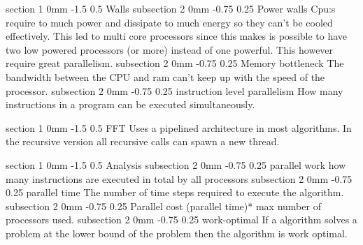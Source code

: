 \documentclass[a4paper,11pt]{article}
\makeatletter
\renewcommand{\section}{\@startsection
   {section}%
   {1}%
   {0mm}%
   {-1.5\baselineskip}%
   {0.5\baselineskip}%
   {\sffamily\bfseries\upshape\normalsize}}%
\renewcommand{\subsection}{\@startsection
   {subsection}%
   {2}%
   {0mm}%
   {-0.75\baselineskip}%
   {0.25\baselineskip}%
   {\rmfamily\normalfont\slshape\normalsize}}%
\makeatother
\begin{document}
\section{Walls}
\subsection{Power walls}
Cpu:s require to much power and dissipate to much energy so they can't be cooled effectively. This led to multi core processors since this makes is possible to have two low powered processors (or more) instead of one powerful. This however require great parallelism.
\subsection{Memory bottleneck}
The bandwidth between the CPU and ram can't keep up with the speed of the processor.
\subsection{instruction level parallelism}
How many instructions in a program can be executed simultaneously. 

\section{FFT}
Uses a pipelined architecture in most algorithms. In the recursive version all recursive calls can spawn a new thread.

\section{Analysis}
\subsection{parallel work}
how many instructions are executed in total by all processors 
\subsection{parallel time}
The number of time steps required to execute the algorithm.
\subsection{Parallel cost}
(parallel time)* max number of processors used. 
\subsection{work-optimal}
If a algorithm solves a problem at the lower bound of the problem then the algorithm is work optimal.
\end{document}
